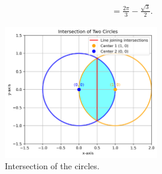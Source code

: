 \documentclass[journal]{IEEEtran}
\begin{document}
 \begin{align}
= \frac{2\pi}{3} - \frac{\sqrt{3}}{2}. 
 \end{align}




\begin{figure}[h]
    \centering
    \includegraphics[width=0.6\textwidth]{fig.png}
    \caption{Intersection of the circles.}
\end{figure}
\end{document}
